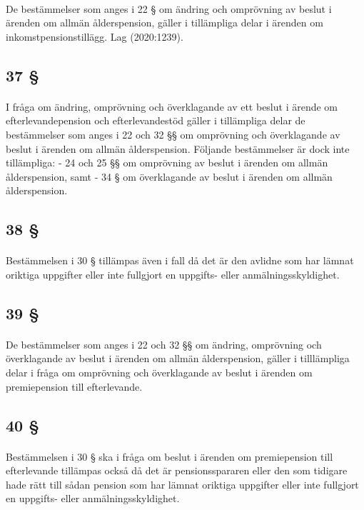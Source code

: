 \documentclass[a4paper,notitlepage,openany,10pt]{book}
\begin{document}
\paragraph*{}
De bestämmelser som anges i 22 § om ändring och omprövning av beslut i ärenden om allmän ålderspension, gäller i tillämpliga delar i ärenden om inkomstpensionstillägg.
Lag (2020:1239).
\subsection*{37 §}
\paragraph*{}
I fråga om ändring, omprövning och överklagande av ett beslut i ärende om efterlevandepension och efterlevandestöd gäller i tillämpliga delar de bestämmelser som anges i 22 och 32 §§ om omprövning och överklagande av beslut i ärenden om allmän ålderspension. Följande bestämmelser är dock inte tillämpliga:
\newline - 24 och 25 §§ om omprövning av beslut i ärenden om allmän ålderspension, samt
\newline - 34 § om överklagande av beslut i ärenden om allmän ålderspension.
\subsection*{38 §}
\paragraph*{}
Bestämmelsen i 30 § tillämpas även i fall då det är den avlidne som har lämnat oriktiga uppgifter eller inte fullgjort en uppgifts- eller anmälningsskyldighet.
\subsection*{39 §}
\paragraph*{}
De bestämmelser som anges i 22 och 32 §§ om ändring, omprövning och överklagande av beslut i ärenden om allmän ålderspension, gäller i tilllämpliga delar i fråga om omprövning och överklagande av beslut i ärenden om premiepension till efterlevande.
\subsection*{40 §}
\paragraph*{}
Bestämmelsen i 30 § ska i fråga om beslut i ärenden om premiepension till efterlevande tillämpas också då det är pensionsspararen eller den som tidigare hade rätt till sådan pension som har lämnat oriktiga uppgifter eller inte fullgjort en uppgifts- eller anmälningsskyldighet.
\end{document}
